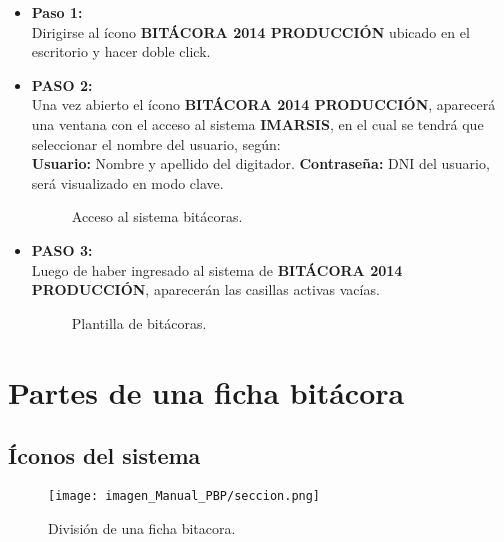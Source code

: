 \documentclass[a4paper,oneside,11pt]{book}
\begin{document}
\begin{itemize}
\item\textbf{Paso 1:}\\
Dirigirse al ícono \textbf{BITÁCORA 2014 PRODUCCIÓN} ubicado en el escritorio y hacer doble click.
\item\textbf{PASO 2:} \\
Una vez abierto el ícono \textbf{BITÁCORA 2014 PRODUCCIÓN}, aparecerá una ventana con el acceso al sistema \textbf{IMARSIS}, en el cual se tendrá que seleccionar el nombre del usuario, según:\\
\subitem\textbf{Usuario:} Nombre y apellido del digitador.
\subitem\textbf{Contraseña:} DNI del usuario, será visualizado en modo clave.
\begin{figure}[htbp]
\centering
{}
\caption{Acceso al sistema bitácoras.}
\vspace{-10pt}
\end{figure}

\item\textbf{PASO 3:}\\
Luego de haber ingresado al sistema de \textbf{BITÁCORA 2014 PRODUCCIÓN}, aparecerán las casillas activas vacías.
 \begin{figure}[!h]
  \begin{center} 
  \caption{Plantilla de bitácoras.}
 \end{center}
  \end{figure}

 \end{itemize}
  
\section {Partes de una ficha bitácora}
\subsection{Íconos del sistema}
  \begin{figure} [!h]
  	\begin{center}
  		\texttt{[image: imagen\_Manual\_PBP/seccion.png]}
  		\caption{División de una ficha bitacora.}
  	\end{center}
  \end{figure}
\end{document}
